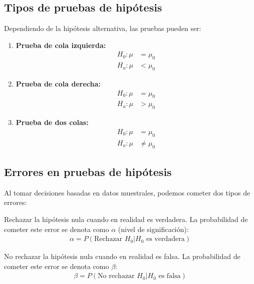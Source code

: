 \subsection{Tipos de pruebas de hipótesis}

Dependiendo de la hipótesis alternativa, las pruebas pueden ser:

\begin{enumerate}
	\item \textbf{Prueba de cola izquierda:}
	\begin{align}
		H_0: \mu &= \mu_0 \\
		H_a: \mu &< \mu_0
	\end{align}

	\item \textbf{Prueba de cola derecha:}
	\begin{align}
		H_0: \mu &= \mu_0 \\
		H_a: \mu &> \mu_0
	\end{align}

	\item \textbf{Prueba de dos colas:}
	\begin{align}
		H_0: \mu &= \mu_0 \\
		H_a: \mu &\neq \mu_0
	\end{align}
\end{enumerate}

\subsection{Errores en pruebas de hipótesis}

Al tomar decisiones basadas en datos muestrales, podemos cometer dos tipos de errores:

\begin{definicion}
	Rechazar la hipótesis nula cuando en realidad es verdadera. La probabilidad de cometer este error se denota como $\alpha$ (nivel de significación):
	\begin{align}
		\alpha = P(\text{Rechazar } H_0 | H_0 \text{ es verdadera})
	\end{align}
\end{definicion}

\begin{definicion}
	No rechazar la hipótesis nula cuando en realidad es falsa. La probabilidad de cometer este error se denota como $\beta$:
	\begin{align}
		\beta = P(\text{No rechazar } H_0 | H_0 \text{ es falsa})
	\end{align}
\end{definicion}

